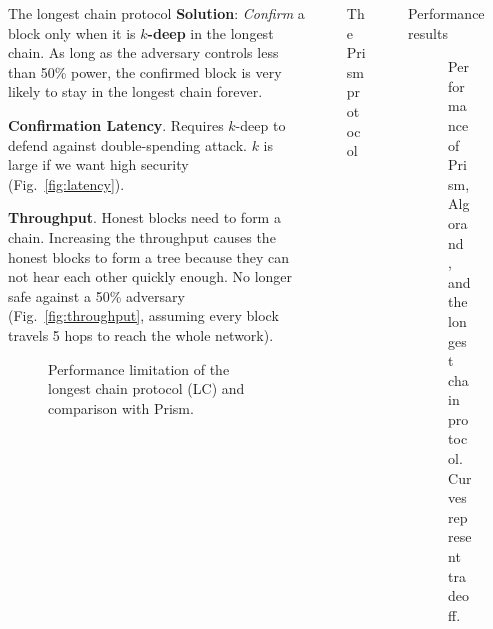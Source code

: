 \documentclass[final]{beamer}
\newlength{\sepwidth}
\newlength{\colwidth}
\newcommand{\separatorcolumn}{\begin{column}{\sepwidth}\end{column}}
\begin{document}
\begin{frame}[t]
\begin{columns}[t]
\begin{column}{\colwidth}
\begin{block}{The longest chain protocol}
  \textbf{Solution}: \textit{Confirm} a block only when it is \textbf{$k$-deep} in the longest chain. As long as the adversary controls less than 50\% power, the confirmed block is very likely to stay in the longest chain forever. 
  
    
  \textbf{Confirmation Latency}. Requires $k$-deep to defend against double-spending attack. $k$ is large if we want high security (Fig.~\ref{fig:latency}).
  
  \textbf{Throughput}. Honest blocks need to form a chain. Increasing the throughput causes the honest blocks to form a tree because they can not hear each other quickly enough. No longer safe against a 50\% adversary (Fig.~\ref{fig:throughput}, assuming every block travels 5 hops to reach the whole network).
  
  \begin{figure}
      \centering
      \caption{Performance limitation of the longest chain protocol (LC) and comparison with Prism.}
  \end{figure}
  \end{block}
  
\end{column}

\separatorcolumn

\begin{column}{\colwidth}

  
  \begin{alertblock}{The Prism protocol}

  
  

  \end{alertblock}

\end{column}

\separatorcolumn

\begin{column}{\colwidth}

\begin{block}{Performance results}
  
    \begin{figure}
      \centering
      
      \caption{Performance of Prism, Algorand~\cite{algorand}, and the longest chain protocol. Curves represent tradeoff.}
    \end{figure}
  \end{block}


\end{column}
\end{columns}
\end{frame}
\end{document}
